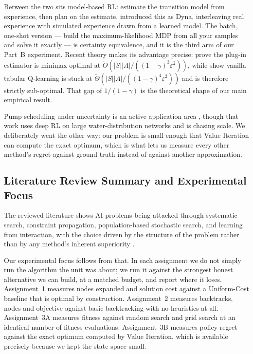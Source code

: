 \documentclass{ai-lab-report}
\begin{document}
Between the two sits model-based RL: estimate the transition model from experience, then plan on
the estimate. \citet{sutton1990integrated} introduced this as Dyna, interleaving real experience
with simulated experience drawn from a learned model. The batch, one-shot version --- build the
maximum-likelihood MDP from all your samples and solve it exactly --- is certainty equivalence,
and it is the third arm of our Part~B experiment. Recent theory makes its advantage precise:
\citet{agarwal2020modelbased} prove the plug-in estimator is minimax optimal at
$\tilde{\Theta}(|S||A|/((1-\gamma)^3\varepsilon^2))$, while \citet{li2024qlearning} show vanilla
tabular Q-learning is stuck at $\tilde{\Theta}(|S||A|/((1-\gamma)^4\varepsilon^2))$ and is
therefore strictly sub-optimal. That gap of $1/(1-\gamma)$ is the theoretical shape of our main
empirical result.

Pump scheduling under uncertainty is an active application area
\citep{hajgato2020drlpumps, hu2023marlpumps, pei2025pumpscheduling}, though that work uses deep
RL on large water-distribution networks and is chasing scale. We deliberately went the other
way: our problem is small enough that Value Iteration can compute the exact optimum, which is
what lets us measure every other method's regret against ground truth instead of against another
approximation.

\subsection{Literature Review Summary and Experimental Focus}
The reviewed literature shows AI problems being attacked through systematic search,
constraint propagation, population-based stochastic search, and learning from interaction,
with the choice driven by the structure of the problem rather than by any method's inherent
superiority \citep{russell2021ai, wolpert1997nfl}.

Our experimental focus follows from that. In each assignment we do not simply run the
algorithm the unit was about; we run it against the strongest honest alternative we can
build, at a matched budget, and report where it loses. Assignment~1 measures nodes expanded
and solution cost against a Uniform-Cost baseline that is optimal by construction.
Assignment~2 measures backtracks, nodes and objective against basic backtracking with no
heuristics at all. Assignment~3A measures fitness against random search and grid search at an
identical number of fitness evaluations. Assignment~3B measures policy regret against the
exact optimum computed by Value Iteration, which is available precisely because we kept the
state space small.
\end{document}
